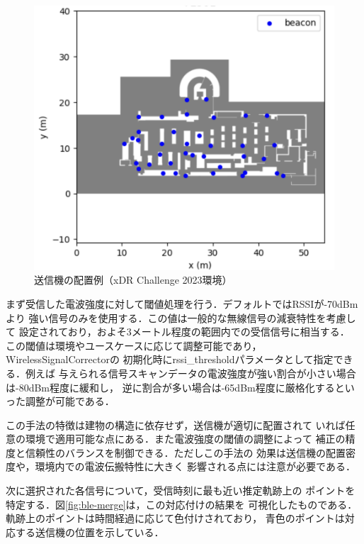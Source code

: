 \begin{figure}[H]
    \centering
    \includegraphics[width=\linewidth]{../image/ble-beacon-position.jpg}
    \caption{送信機の配置例（xDR Challenge 2023環境）}    \label{fig:ble-beacon-position}
\end{figure}


まず受信した電波強度に対して閾値処理を行う．デフォルトではRSSIが-70dBmより
強い信号のみを使用する．この値は一般的な無線信号の減衰特性を考慮して
設定されており，およそ3メートル程度の範囲内での受信信号に相当する．
この閾値は環境やユースケースに応じて調整可能であり，WirelessSignalCorrectorの
初期化時にrssi\_thresholdパラメータとして指定できる．例えば
与えられる信号スキャンデータの電波強度が強い割合が小さい場合は-80dBm程度に緩和し，
逆に割合が多い場合は-65dBm程度に厳格化するといった調整が可能である．


この手法の特徴は建物の構造に依存せず，送信機が適切に配置されて
いれば任意の環境で適用可能な点にある．また電波強度の閾値の調整によって
補正の精度と信頼性のバランスを制御できる．ただしこの手法の
効果は送信機の配置密度や，環境内での電波伝搬特性に大きく
影響される点には注意が必要である．

次に選択された各信号について，受信時刻に最も近い推定軌跡上の
ポイントを特定する．図\ref{fig:ble-merge}は，この対応付けの結果を
可視化したものである．軌跡上のポイントは時間経過に応じて色付けされており，
青色のポイントは対応する送信機の位置を示している．

